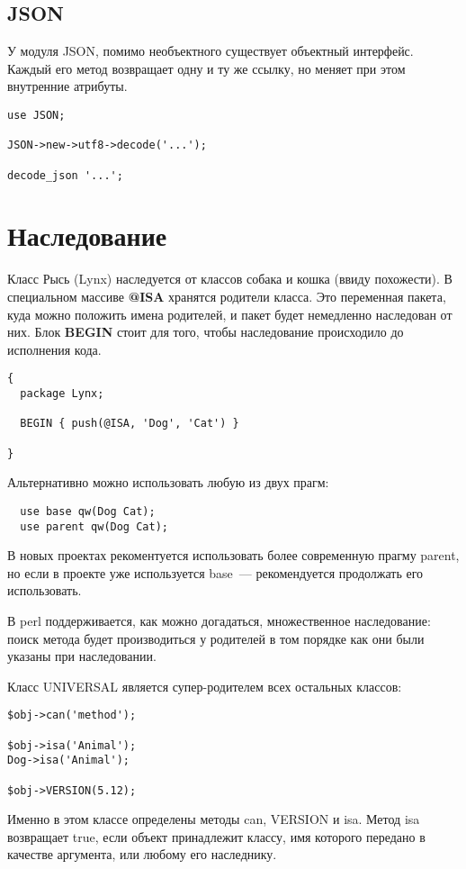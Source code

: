 \subsection{JSON} %
У модуля JSON, помимо необъектного существует объектный интерфейс.
Каждый его метод возвращает одну и ту же ссылку, но меняет при этом внутренние атрибуты.
\begin{verbatim}
use JSON;

JSON->new->utf8->decode('...');

decode_json '...';
\end{verbatim}


\section{Наследование}%
Класс Рысь (Lynx) наследуется от классов собака и кошка (ввиду похожести). В специальном массиве \textbf{@ISA} хранятся родители класса. Это переменная пакета, куда можно положить имена родителей, и пакет будет немедленно наследован от них. Блок \textbf{BEGIN} стоит для того, чтобы наследование происходило до исполнения кода.
\begin{verbatim}
{
  package Lynx;

  BEGIN { push(@ISA, 'Dog', 'Cat') }

}
\end{verbatim}
Альтернативно можно использовать любую из двух прагм:
\begin{verbatim}
  use base qw(Dog Cat);
  use parent qw(Dog Cat);
\end{verbatim}
В новых проектах рекоментуется использовать более современную прагму parent, но если в проекте уже используется base~--- рекомендуется продолжать его использовать.

В perl поддерживается, как можно догадаться, множественное наследование: поиск метода будет производиться у родителей в том порядке как они были указаны при наследовании.

Класс UNIVERSAL является супер-родителем всех остальных классов:
\begin{verbatim}
$obj->can('method');

$obj->isa('Animal');
Dog->isa('Animal');

$obj->VERSION(5.12);
\end{verbatim}
Именно в этом классе определены методы can, VERSION и isa. Метод isa возвращает true, если объект принадлежит классу, имя которого передано в качестве аргумента, или любому его наследнику.

